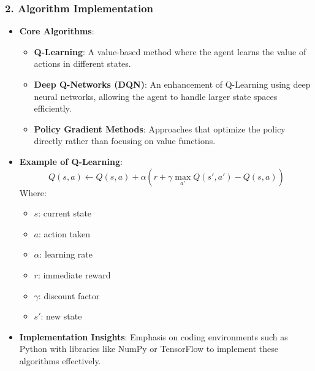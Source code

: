 \documentclass[aspectratio=169]{beamer}
\begin{document}
\begin{frame}[fragile]
    \frametitle{2. Algorithm Implementation}
    \begin{itemize}
        \item \textbf{Core Algorithms}:
        \begin{itemize}
            \item \textbf{Q-Learning}: A value-based method where the agent learns the value of actions in different states.
            \item \textbf{Deep Q-Networks (DQN)}: An enhancement of Q-Learning using deep neural networks, allowing the agent to handle larger state spaces efficiently.
            \item \textbf{Policy Gradient Methods}: Approaches that optimize the policy directly rather than focusing on value functions.
        \end{itemize}
        \item \textbf{Example of Q-Learning}:
        \begin{equation}
            Q(s, a) \gets Q(s, a) + \alpha \left( r + \gamma \max_{a'} Q(s', a') - Q(s, a) \right)
        \end{equation}
        Where:
        \begin{itemize}
            \item \( s \): current state
            \item \( a \): action taken
            \item \( \alpha \): learning rate
            \item \( r \): immediate reward
            \item \( \gamma \): discount factor
            \item \( s' \): new state
        \end{itemize}
        \item \textbf{Implementation Insights}: Emphasis on coding environments such as Python with libraries like NumPy or TensorFlow to implement these algorithms effectively.
    \end{itemize}
\end{frame}
\end{document}
